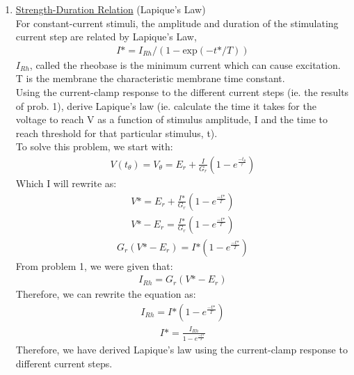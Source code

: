 \documentclass[11pt]{article}
\begin{document}
\begin{enumerate}[label=\arabic*.]
\newpage
\item
\underline{Strength-Duration Relation} (Lapique's Law)
\vspace*{1\baselineskip}
\\
For constant-current stimuli, the amplitude and duration of the stimulating current step are related by Lapique's Law,
\begin{align*}
I\text{*} = I_{Rh} / (1 - \text{exp}(-t\text{*} / T))
\end{align*}
$I_{Rh}$, called the rheobase is the minimum current which can cause excitation. T is the membrane the characteristic membrane time constant.
\vspace*{1\baselineskip}
\\
Using the current-clamp response to the different current steps (ie. the results of prob. 1), derive Lapique's law (ie. calculate the time it takes for the voltage to reach V\text{*} as a function of stimulus amplitude, I\text{*} and the time to reach threshold for that particular stimulus, t\text{*}).
\vspace*{1\baselineskip}
\\
To solve this problem, we start with:
\begin{align*}
V(t_\theta) = V_\theta = E_r + \frac{I} {G_r} \left(1 - e ^ {\frac{-t_\theta} {\tau}}\right)
\end{align*}
Which I will rewrite as:
\begin{align*}
V\text{*} = E_r + \frac{I\text{*}} {G_r} \left(1 - e ^ {\frac{-t\text{*}} {T}}\right)
\end{align*}
\begin{align*}
V\text{*} - E_r = \frac{I\text{*}} {G_r} \left(1 - e ^ {\frac{-t\text{*}} {T}}\right)
\end{align*}
\begin{align*}
G_r \left(V\text{*} - E_r\right) = I\text{*} \left(1 - e ^ {\frac{-t\text{*}} {T}}\right)
\end{align*}
From problem 1, we were given that:
\begin{align*}
I_{Rh} = G_r \left(V\text{*} - E_r\right)
\end{align*}
Therefore, we can rewrite the equation as:
\begin{align*}
I_{Rh} = I\text{*} \left(1 - e ^ {\frac{-t\text{*}} {T}}\right)
\end{align*}
\begin{align*}
I\text{*} = \frac{I_{Rh}} {1 - e ^ {\frac{-t\text{*}} {T}}}
\end{align*}
Therefore, we have derived Lapique's law using the current-clamp response to different current steps.




\end{enumerate}
\end{document}
